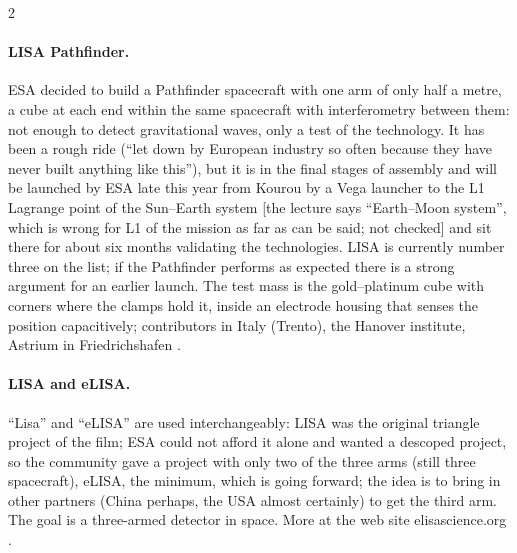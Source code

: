\begin{paracol}{2}
\paragraph{LISA Pathfinder.} ESA decided to build a Pathfinder spacecraft with one arm of only half a metre, a cube at each end within the same spacecraft with interferometry between them: not enough to detect gravitational waves, only a test of the technology. It has been a rough ride (``let down by European industry so often because they have never built anything like this''), but it is in the final stages of assembly and will be launched by ESA late this year from Kourou by a Vega launcher to the L1 Lagrange point of the Sun--Earth system [the lecture says ``Earth--Moon system'', which is wrong for L1 of the mission as far as can be said; not checked] and sit there for about six months validating the technologies. LISA is currently number three on the list; if the Pathfinder performs as expected there is a strong argument for an earlier launch. The test mass is the gold--platinum cube with corners where the clamps hold it, inside an electrode housing that senses the position capacitively; contributors in Italy (Trento), the Hanover institute, Astrium in Friedrichshafen .

\paragraph{LISA and eLISA.} ``Lisa'' and ``eLISA'' are used interchangeably: LISA was the original triangle project of the film; ESA could not afford it alone and wanted a descoped project, so the community gave a project with only two of the three arms (still three spacecraft), eLISA, the minimum, which is going forward; the idea is to bring in other partners (China perhaps, the USA almost certainly) to get the third arm. The goal is a three-armed detector in space. More at the web site elisascience.org .


\end{paracol}
